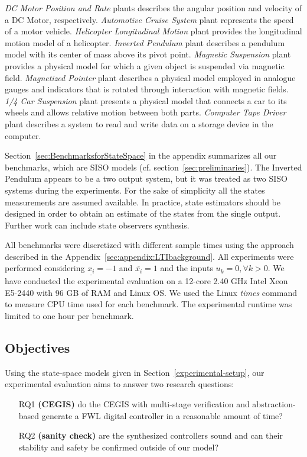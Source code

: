 \documentclass[runningheads,a4paper]{llncs}
\begin{document}
\textit{DC Motor Position and Rate} plants describes the angular position and 
velocity of a DC Motor, respectively. 
\textit{Automotive Cruise System} plant represents the speed of a motor vehicle. 
\textit{Helicopter Longitudinal Motion} plant provides the longitudinal motion model 
of a helicopter. 
\textit{Inverted Pendulum} plant describes a pendulum model
with its center of mass above its pivot point. 
\textit{Magnetic Suspension} plant provides a physical model for which 
a given object is suspended via magnetic field. 
\textit{Magnetized Pointer} plant describes a physical model employed in analogue gauges 
and indicators that is rotated through interaction with magnetic fields.
\textit{1/4 Car Suspension} plant presents a physical model that connects a car to its wheels 
and allows relative motion between both parts.
\textit{Computer Tape Driver} plant describes a system to read and write data 
on a storage device in the computer.

Section~\ref{sec:BenchmarksforStateSpace} in the appendix summarizes 
all our benchmarks, which are SISO models (cf. section~\ref{sec:preliminaries}). 
The Inverted Pendulum appears to be a two output system, but it was treated as two 
SISO systems during the experiments. For the sake of simplicity all the states 
measurements are assumed available. In practice, state estimators should be designed 
in order to obtain an estimate of the states from the single output. 
Further work can include 
state observers synthesis.

All benchmarks were discretized with different sample times using 
the approach described in the Appendix~\ref{sec:appendix:LTIbackground}. 
All experiments were performed considering $\underline{x_{i}}=-1$ and 
$\overline{x_{i}}=1$ and the inputs $u_{k}=0, \forall k>0$.
We have conducted the experimental evaluation on a 12-core 2.40 GHz
Intel Xeon E5-2440 with 96 GB of RAM and Linux OS. We used the Linux \emph{times} command
to measure CPU time used for each benchmark. The experimental runtime was limited to
one hour per benchmark.
%

\subsection{Objectives}

Using the state-space models given in Section~\ref{experimental-setup}, 
our experimental evaluation aims to answer two research questions:
%
\begin{enumerate}

\item[RQ1] \textbf{(CEGIS)} do the CEGIS with multi-stage 
verification and abstraction-based generate a FWL digital 
controller in a reasonable amount of time?

\item[RQ2] \textbf{(sanity check)} are the synthesized controllers sound
and can their stability and safety be confirmed outside of our model?

\end{enumerate}
\end{document}
